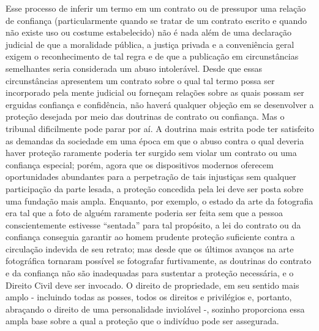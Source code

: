 Esse processo de inferir um termo em um contrato ou de pressupor uma
relação de confiança (particularmente quando se tratar de um contrato
escrito e quando não existe uso ou costume estabelecido) não é nada além
de uma declaração judicial de que a moralidade pública, a justiça
privada e a conveniência geral exigem o reconhecimento de tal regra e de
que a publicação em circunstâncias semelhantes seria considerada um
abuso intolerável. Desde que essas circunstâncias apresentem um contrato
sobre o qual tal termo possa ser incorporado pela mente judicial ou
forneçam relações sobre as quais possam ser erguidas confiança e
confidência, não haverá qualquer objeção em se desenvolver a proteção
desejada por meio das doutrinas de contrato ou confiança. Mas o tribunal
dificilmente pode parar por aí. A doutrina mais estrita pode ter
satisfeito as demandas da sociedade em uma época em que o abuso contra o
qual deveria haver proteção raramente poderia ter surgido sem violar um
contrato ou uma confiança especial; porém, agora que os dispositivos
modernos oferecem oportunidades abundantes para a perpetração de tais
injustiças sem qualquer participação da parte lesada, a proteção
concedida pela lei deve ser posta sobre uma fundação mais ampla.
Enquanto, por exemplo, o estado da arte da fotografia era tal que a foto
de alguém raramente poderia ser feita sem que a pessoa conscientemente
estivesse ``sentada'' para tal propósito, a lei do contrato ou da
confiança conseguia garantir ao homem prudente proteção suficiente
contra a circulação indevida de seu retrato; mas desde que os últimos
avanços na arte fotográfica tornaram possível se fotografar
furtivamente, as doutrinas do contrato e da confiança não são
inadequadas para sustentar a proteção necessária, e o Direito Civil deve
ser invocado. O direito de propriedade, em seu sentido mais amplo -
incluindo todas as posses, todos os direitos e privilégios e, portanto,
abraçando o direito de uma personalidade inviolável -, sozinho
proporciona essa ampla base sobre a qual a proteção que o indivíduo pode
ser assegurada.

